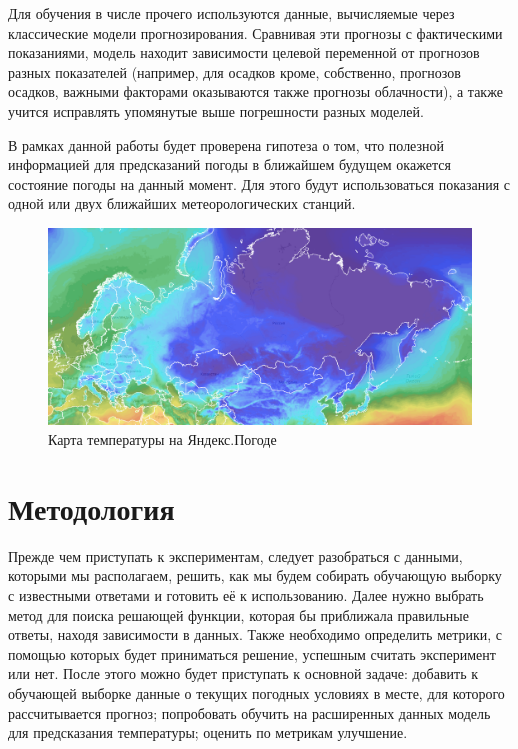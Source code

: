 \documentclass[14pt]{matmex-diploma}
\begin{document}
Для обучения в числе прочего используются данные, вычисляемые через классические модели прогнозирования. Сравнивая эти прогнозы с фактическими показаниями, модель находит зависимости целевой переменной от прогнозов разных показателей (например, для осадков кроме, собственно, прогнозов осадков, важными факторами оказываются также прогнозы облачности), а также учится исправлять упомянутые выше погрешности разных моделей.

В рамках данной работы будет проверена гипотеза о том, что полезной информацией для предсказаний погоды в ближайшем будущем окажется состояние погоды на данный момент. Для этого будут использоваться показания с одной или двух ближайших метеорологических станций.


\begin{figure}
\centering
\includegraphics[width=\linewidth]{images/map_coursework.png}
\caption{Карта температуры на Яндекс.Погоде}
\label{fig:map}
\end{figure}



\section{Методология}
Прежде чем приступать к экспериментам, следует разобраться с данными, которыми мы располагаем, решить, как мы будем собирать обучающую выборку с известными ответами и готовить её к использованию. Далее нужно выбрать метод для поиска решающей функции, которая бы приближала правильные ответы, находя зависимости в данных. Также необходимо определить метрики, с помощью которых будет приниматься решение, успешным считать эксперимент или нет. После этого можно будет приступать к основной задаче: добавить к обучающей выборке данные о текущих погодных условиях в месте, для которого рассчитывается прогноз; попробовать обучить на расширенных данных модель для предсказания температуры; оценить по метрикам улучшение.
\end{document}

